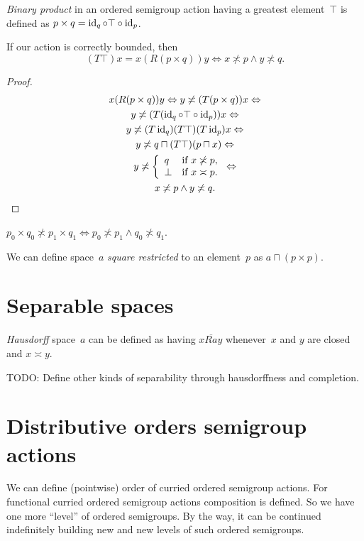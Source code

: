 \emph{Binary product} in an ordered semigroup action having a greatest element~$\top$ is defined as $p\times q=\operatorname{id}_q\circ\top\circ\operatorname{id}_p$.

\begin{thm}
If our action is correctly bounded, then
\[ (T\top)x=
x(R(p\times q))y\Leftrightarrow x\nasymp p\land y\nasymp q. \]
\end{thm}

\begin{proof}
\begin{multline*}
x(R(p\times q))y \Leftrightarrow
y\not\asymp(T(p\times q))x \Leftrightarrow \\
y\not\asymp(T(\operatorname{id}_q\circ\top\circ\operatorname{id}_p))x \Leftrightarrow \\
y\not\asymp (T\operatorname{id}_q)(T\top)(T\operatorname{id}_p)x \Leftrightarrow \\
y\not\asymp q\sqcap(T\top)(p\sqcap x) \Leftrightarrow \\
y\not\asymp
\left\{\begin{array}{ll}q&\text{if }x\not\asymp p,\\\bot&\text{if }x\asymp p.\end{array}\right. \Leftrightarrow \\
x\not\asymp p\land y\not\asymp q.
\end{multline*}
\end{proof}

\begin{thm}
$p_0\times q_0\nasymp p_1\times q_1 \Leftrightarrow p_0\nasymp p_1\land q_0\nasymp q_1$.
\end{thm}

We can define space~$a$ \emph{square restricted} to an element~$p$ as $a\sqcap(p\times p)$.

\section{Separable spaces}

\emph{Hausdorff} space~$a$ can be defined as having $x\overline{Ra}y$ whenever~$x$ and $y$ are closed and $x\asymp y$.

TODO: Define other kinds of separability through hausdorffness and completion.

\section{Distributive orders semigroup actions}

We can define (pointwise) order of curried ordered semigroup actions. For functional curried ordered semigroup actions composition is defined. So we have one more ``level'' of ordered semigroups. By the way, it can be continued indefinitely building new and new levels of such ordered semigroups.

